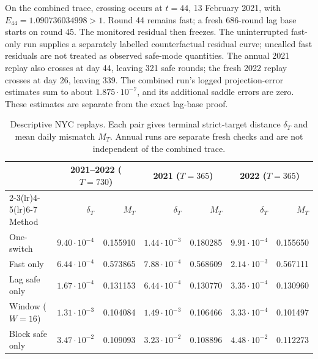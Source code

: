 On the combined trace, crossing occurs at $t=44$, 13 February 2021,
with $E_{44}=1.090736034998>1$. Round 44 remains fast; a fresh 686-round
lag base starts on round 45. The monitored residual then freezes.
The uninterrupted fast-only run supplies a separately labelled
counterfactual residual curve; uncalled fast residuals are not treated as
observed safe-mode quantities.
The annual 2021 replay also crosses at day 44, leaving 321 safe rounds;
the fresh 2022 replay crosses at day 26, leaving 339.
The combined run's logged projection-error estimates sum to about
$1.875\cdot10^{-7}$, and its additional saddle errors are zero.
These estimates are separate from the exact lag-base proof.

\begin{table}[t]
  \caption{Descriptive NYC replays. Each pair gives terminal strict-target
  distance $\delta_T$ and mean daily mismatch $M_T$. Annual runs are separate
  fresh checks and are not independent of the combined trace.}
  \label{tab:supp-nyc-replays}
  \centering
  \begin{tabular}{lrrrrrr}
    \toprule
    & \multicolumn{2}{c}{2021--2022 ($T=730$)}
    & \multicolumn{2}{c}{2021 ($T=365$)}
    & \multicolumn{2}{c}{2022 ($T=365$)} \\
    \cmidrule(lr){2-3}\cmidrule(lr){4-5}\cmidrule(lr){6-7}
    Method & $\delta_T$ & $M_T$ & $\delta_T$ & $M_T$ & $\delta_T$ & $M_T$ \\
    \midrule
    One-switch & $9.40\cdot10^{-4}$ & 0.155910 & $1.44\cdot10^{-3}$ & 0.180285 & $9.91\cdot10^{-4}$ & 0.155650 \\
    Fast only & $6.44\cdot10^{-4}$ & 0.573865 & $7.88\cdot10^{-4}$ & 0.568609 & $2.14\cdot10^{-3}$ & 0.567111 \\
    Lag safe only & $1.67\cdot10^{-4}$ & 0.131153 & $6.44\cdot10^{-4}$ & 0.130770 & $3.35\cdot10^{-4}$ & 0.130960 \\
    Window ($W=16$) & $1.31\cdot10^{-3}$ & 0.104084 & $1.49\cdot10^{-3}$ & 0.106466 & $3.33\cdot10^{-4}$ & 0.101497 \\
    Block safe only & $3.47\cdot10^{-2}$ & 0.109093 & $3.23\cdot10^{-2}$ & 0.108896 & $4.48\cdot10^{-2}$ & 0.112273 \\
    \bottomrule
  \end{tabular}
\end{table}

